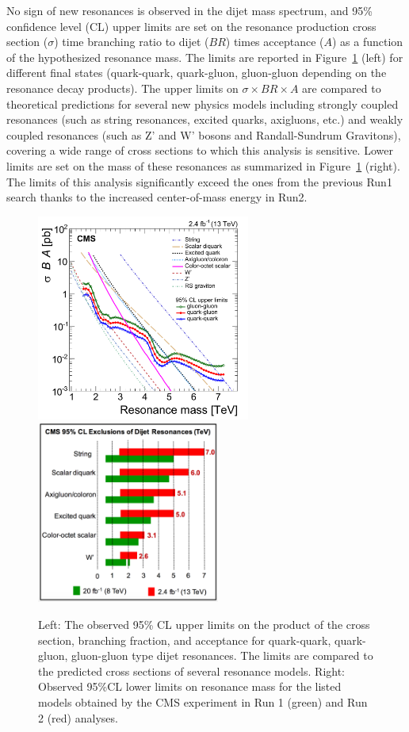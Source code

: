 \documentclass[epj]{webofc}
\begin{document}
%
No sign of new resonances is observed in the dijet mass spectrum, and
95\% confidence level (CL) upper limits are set on the resonance 
production cross section ($\sigma$) time branching ratio to dijet
($BR$) times acceptance ($A$) as a function of the hypothesized
resonance mass. The limits are reported in Figure~\ref{dijetLimits} (left) for
different final states (quark-quark, quark-gluon, gluon-gluon
depending on the resonance decay products). The upper limits on
$\sigma \times BR \times A$ are compared to theoretical predictions
for several new physics models including strongly coupled
resonances (such as string resonances, excited quarks, axigluons, etc.) and
weakly coupled resonances (such as Z' and W' bosons and Randall-Sundrum Gravitons), covering a
wide range of cross sections to which this analysis is
sensitive. Lower limits are set on the mass of these resonances 
as summarized in Figure~\ref{dijetLimits} (right). The limits of this analysis 
significantly exceed the ones from the previous Run1 search thanks 
to the increased center-of-mass energy in Run2.  
%
\begin{figure}[h]
\centering
\includegraphics[width=7cm,clip]{CMS-EXO-15-001_Figure_003-d.pdf}
\includegraphics[width=6cm,clip]{CMS-EXO-15-001_Figure-aux_013.png}
\caption{Left: The observed 95\% CL upper limits on the product of the
  cross section, branching fraction, and acceptance for quark-quark,
  quark-gluon, gluon-gluon type dijet resonances.  The limits are
  compared to the predicted cross sections of  several resonance
  models. Right: Observed 95\%CL lower limits on resonance mass
  for the listed models obtained by the CMS experiment in Run 1
  (green) and Run 2 (red) analyses.}
\label{dijetLimits}       %
\end{figure}
%
\end{document}
